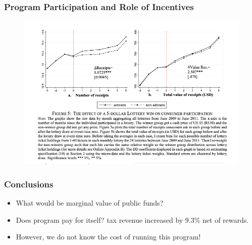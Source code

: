 \documentclass{beamer}
\begin{document}
\begin{frame}
\frametitle{Program Participation and Role of Incentives}
\begin{figure}
    \centering
    \includegraphics[width=\textwidth]{Paper Presentations/Consumers as Tax Auditors/F5.png}
\end{figure}
\end{frame}

\begin{frame}
\frametitle{Conclusions}
\begin{itemize}
    \item What would be marginal value of public funds? 
    \item Does program pay for itself? tax revenue increased by 9.3\% net of rewards.
    \item However, we do not know the cost of running this program!
\end{itemize}
\end{frame}
\end{document}
